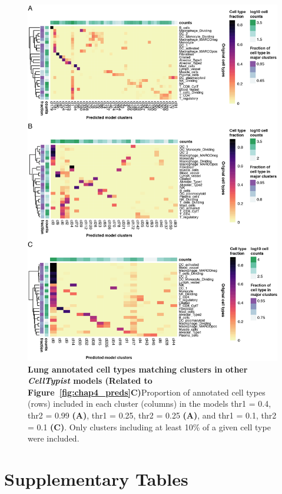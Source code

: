\begin{figure}[ht!] 
\centering
\includegraphics[scale=0.83]{Appendix2/Figs/appB_otherCtFrac_lung.png} %
\caption[Lung annotated cell types matching clusters in other \textit{CellTypist} models]{\textbf{Lung annotated cell types matching clusters in other \textit{CellTypist} models (Related to Figure~\ref{fig:chap4_preds}C)}\newline Proportion of annotated cell types (rows) included in each cluster (columns) in the models thr1 = 0.4, thr2 = 0.99 \textbf{(A)}, thr1 = 0.25, thr2 = 0.25 \textbf{(A)}, and thr1 = 0.1, thr2 = 0.1 \textbf{(C)}. Only clusters including at least 10\% of a given cell type were included.}
\label{fig:appB_otherct}
\end{figure}


\section{Supplementary Tables}
\label{sectionB1.2}

